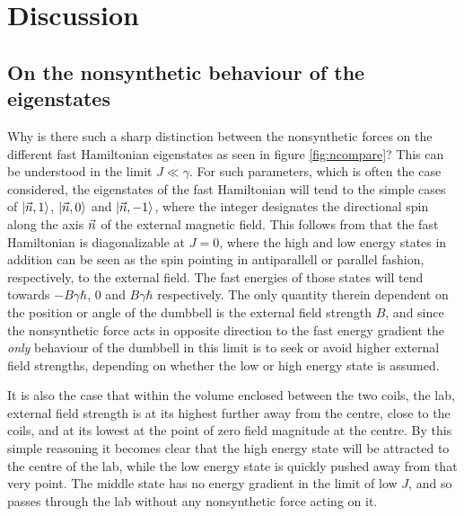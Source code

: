 \documentclass[main.tex]{subfiles}
\begin{document}
\section{Discussion}
\subsection{On the nonsynthetic behaviour of the eigenstates}\label{sec:nonsynbeh}
Why is there such a sharp distinction between the nonsynthetic forces on the different fast
Hamiltonian eigenstates as seen in figure \ref{fig:ncompare}? This can be understood
in the limit \(J \ll \gamma\). For such parameters, which is often the case considered, the
eigenstates of the fast Hamiltonian will tend to the simple cases of \(\ket{\vec{n}, 1}\),
\(\ket{\vec{n}, 0}\) and \(\ket{\vec{n}, -1}\), where the integer designates the directional
spin along the axis \(\vec{n}\) of the external magnetic field. This follows from that the fast
Hamiltonian is diagonalizable at \(J = 0\), where the high and low energy states
in addition can be seen as the spin pointing in antiparallell or
parallel fashion, respectively, to the external field. The fast energies of those
states will tend towards \(-B\gamma\hbar{}\), \(0\) and \(B\gamma \hbar{}\) respectively.
The only quantity therein dependent on the position or angle of the dumbbell is the
external field strength \(B\), and since the nonsynthetic force acts in opposite direction
to the fast energy gradient the \textit{only} behaviour of the dumbbell in this limit is to
seek or avoid higher external field strengths, depending on whether the low or high energy
state is assumed. 

It is also the case that within the volume enclosed between the two coils, the lab,
external field strength is at its highest further away from the centre, close to the coils,
and at its lowest at the point of zero field magnitude at the centre. By this simple
reasoning it becomes clear that the high energy state will be attracted to the centre of
the lab, while the low energy state is quickly pushed away from that very point. The middle
state has no energy gradient in the limit of low \(J\), and so passes through the lab
without any nonsynthetic force acting on it.
\end{document}
